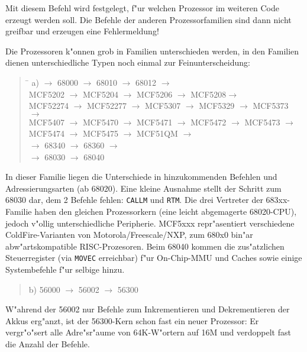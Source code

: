 \documentclass[12pt,a4paper,twoside]{report}
\newcommand{\tty}[1]{{\tt #1}}
\begin{document}
Mit diesem Befehl wird festgelegt, f"ur welchen Prozessor im weiteren
Code erzeugt werden soll.  Die Befehle der anderen Prozessorfamilien
sind dann nicht greifbar und erzeugen eine Fehlermeldung!
\par
Die Prozessoren k"onnen grob in Familien unterschieden werden, in den
Familien dienen unterschiedliche Typen noch einmal zur Feinunterscheidung:
\begin{quote}
\begin{tabbing}
\hspace{0.7cm} \= \kill
a)  $\rightarrow$ 68000 $\rightarrow$ 68010 $\rightarrow$ 68012 $\rightarrow$ \\
   \> MCF5202 $\rightarrow$ MCF5204 $\rightarrow$ MCF5206 $\rightarrow$ MCF5208$\rightarrow$ \\
   \> MCF52274 $\rightarrow$ MCF52277 $\rightarrow$ MCF5307 $\rightarrow$ MCF5329 $\rightarrow$ MCF5373 $\rightarrow$ \\
   \> MCF5407 $\rightarrow$ MCF5470 $\rightarrow$ MCF5471 $\rightarrow$ MCF5472 $\rightarrow$ MCF5473 $\rightarrow$ \\
   \> MCF5474 $\rightarrow$ MCF5475 $\rightarrow$ MCF51QM $\rightarrow$ \\
    $\rightarrow$ 68340 $\rightarrow$ 68360 $\rightarrow$ \\
    $\rightarrow$ 68030 $\rightarrow$ 68040
\end{tabbing}
\end{quote}
In dieser Familie liegen die Unterschiede in hinzukommenden Befehlen
und Adressierungsarten (ab 68020).  Eine kleine Ausnahme stellt der
Schritt zum 68030 dar, dem 2 Befehle fehlen: \tty{CALLM} und \tty{RTM}.
Die drei Vertreter der 683xx-Familie haben den gleichen Prozessorkern (eine
leicht abgemagerte 68020-CPU), jedoch v"ollig unterschiedliche Peripherie.
MCF5xxx repr"asentiert verschiedene ColdFire-Varianten von Motorola/Freescale/NXP,
zum 680x0 bin"ar abw"artskompatible RISC-Prozesoren. Beim 68040 kommen die zus"atzlichen
Steuerregister (via \tty{MOVEC} erreichbar) f"ur On-Chip-MMU und Caches
sowie einige Systembefehle f"ur selbige hinzu.
\begin{quote}
b) 56000 $\longrightarrow$ 56002 $\longrightarrow$ 56300
\end{quote}
W"ahrend der 56002 nur Befehle zum Inkrementieren und Dekrementieren der
Akkus erg"anzt, ist der 56300-Kern schon fast ein neuer Prozessor: Er
vergr"o"sert alle Adre"sr"aume von 64K-W"ortern auf 16M und verdoppelt fast
die Anzahl der Befehle.
\end{document}
